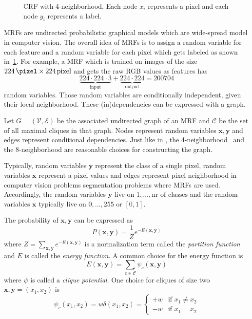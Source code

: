 \begin{figure}
\caption{\gls{CRF} with 4-neighborhood. Each node $x_i$ represents a pixel and
         each node $y_i$ represents a label.}
\label{fig:crf-image}
\end{figure}
\Glspl{MRF} are undirected probabilistic graphical models which are wide-spread
model in computer vision. The overall idea of \glspl{MRF} is to assign a random
variable for each feature and a random variable for each pixel which gets
labeled as shown in~\cref{fig:crf-image}. For example, a \gls{MRF} which is
trained on images of the size
$\SI{224}{\pixel} \times \SI{224}{pixel}$ and gets the raw RGB values as
features has
\[\underbrace{224 \cdot 224 \cdot 3}_{\text{input}} + \underbrace{224 \cdot 224}_{\text{output}} = \num{200704}\]
random variables. Those random variables are conditionally independent, given
their local neighborhood. These (in)dependencies can be expressed with a graph.

Let $G=(\mathcal{V}, \mathcal{E})$ be the associated undirected graph of an
\gls{MRF} and $\mathcal{C}$ be the set of all maximal cliques in that graph.
Nodes represent random variables $\mathbf{x}, \mathbf{y}$ and edges represent
conditional dependencies. Just like in
, the
4-neighborhood~\cite{shotton2006textonboost} and the 8-neighborhood are
reasonable choices for constructing the graph.

Typically, random variables $\mathbf{y}$ represent the class of a single pixel,
random variables $\mathbf{x}$ represent a pixel values and edges represent
pixel neighborhood in computer vision problems segmentation problems where
\glspl{MRF} are used. Accordingly, the random variables $\mathbf{y}$ live on
$1, \dots, \text{nr of classes}$ and the random variables $\mathbf{x}$
typically live on $0, \dots, 255$ or $[0, 1]$.

The probability of $\mathbf{x}, \mathbf{y}$ can be expressed as
\[P(\mathbf{x}, \mathbf{y}) = \frac{1}{Z} e^{-E(\mathbf{x}, \mathbf{y})}\]
where $Z = \sum_{\mathbf{x}, \mathbf{y}} e^{-E(\mathbf{x}, \mathbf{y})}$ is a normalization term called
the \textit{partition function} and $E$ is called the \textit{energy function}.
A common choice for the energy function is
\[E(\mathbf{x}, \mathbf{y}) = \sum_{c \in \mathcal{C}} \psi_c(\mathbf{x}, \mathbf{y})\]
where $\psi$ is called a \textit{clique potential}. One choice for cliques
of size two $\mathbf{x}, \mathbf{y} = (x_1, x_2)$ is~\cite{kato2006markov}
\[\psi_c(x_1, x_2) = w \delta(x_1, x_2) = \begin{cases}+w &\text{if } x_1 \neq x_2\\-w &\text{if } x_1 = x_2\end{cases}\]


